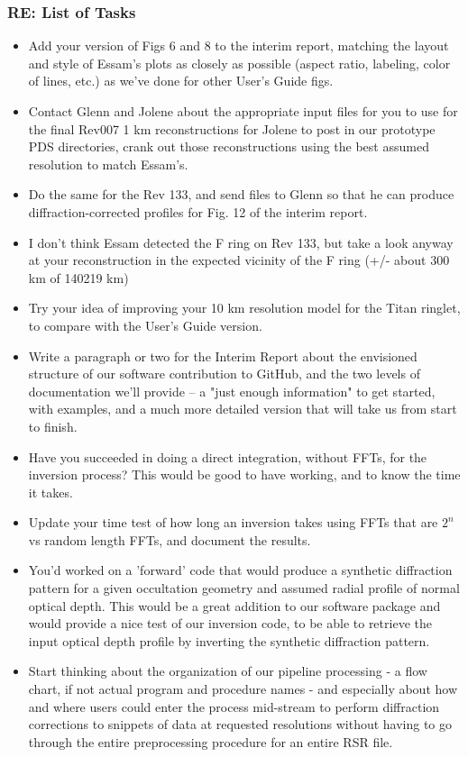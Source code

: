 \documentclass[crop=false,class=article,oneside]{standalone}
\begin{document}
\subsubsection{\footnotesize RE: List of Tasks}
\begin{itemize}
    \item Add your version of Figs 6 and 8 to the interim report, matching the layout and style of Essam's plots as closely as possible (aspect ratio, labeling, color of lines, etc.) as we've done for other User's Guide figs.
    \item Contact Glenn and Jolene about the appropriate input files for you to use for the final Rev007 1 km reconstructions for Jolene to post in our prototype PDS directories, crank out those reconstructions using the best assumed resolution to match Essam's.
    \item Do the same for the Rev 133, and send files to Glenn so that he can produce diffraction-corrected profiles for Fig. 12 of the interim report. 
    \item I don't think Essam detected the F ring on Rev 133, but take a look anyway at your reconstruction in the expected vicinity of the F ring (+/- about 300 km of 140219 km)
    \item Try your idea of improving your 10 km resolution model for the Titan ringlet, to compare with the User's Guide version. 
    \item Write a paragraph or two for the Interim Report about the envisioned structure of our software contribution to GitHub, and the two levels of documentation we'll provide -- a "just enough information" to get started, with examples, and a much more detailed version that will take us from start to finish.
    \item Have you succeeded in doing a direct integration, without FFTs, for the inversion process? This would be good to have working, and to know the time it takes.
    \item Update your time test of how long an inversion takes using FFTs that are $2^n$ vs random length FFTs, and document the results.
    \item You'd worked on a 'forward' code that would produce a synthetic diffraction pattern for a given occultation geometry and assumed radial profile of normal optical depth. This would be a great addition to our software package and would provide a nice test of our inversion code, to be able to retrieve the input optical depth profile by inverting the synthetic diffraction pattern.
    \item Start thinking about the organization of our pipeline processing - a flow chart, if not actual program and procedure names - and especially about how and where users could enter the process mid-stream to perform diffraction corrections to snippets of data at requested resolutions without having to go through the entire preprocessing procedure for an entire RSR file.

\end{itemize}
\end{document}
